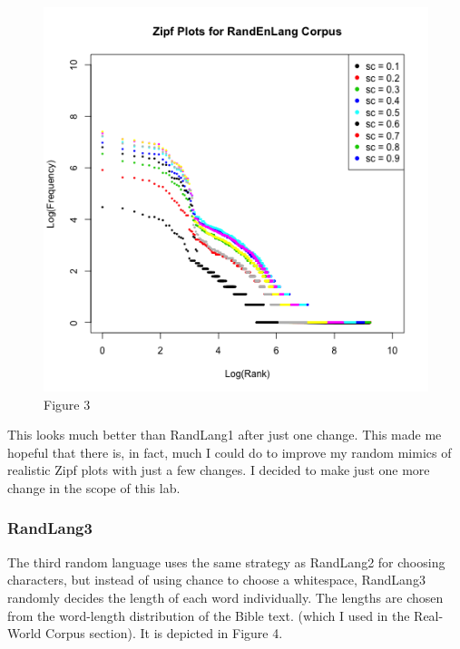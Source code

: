 \documentclass{article}
\begin{document}
\begin{figure}[h]
\centering
\includegraphics[width=13cm,keepaspectratio]{randenlang-combined.png}
\captionsetup{labelformat=empty} \caption{Figure 3}
\end{figure}


This looks much better than RandLang1 after just one change. This made me hopeful that there is, in fact, much I could do to improve my random mimics of realistic Zipf plots with just a few changes. I decided to make just one more change in the scope of this lab.

\subsubsection{RandLang3}

The third random language uses the same strategy as RandLang2 for choosing characters, but instead of using chance to choose a whitespace, RandLang3 randomly decides the length of each word individually. The lengths are chosen from the word-length distribution of the Bible text. (which I used in the Real-World Corpus section). It is depicted in Figure 4.
\end{document}
